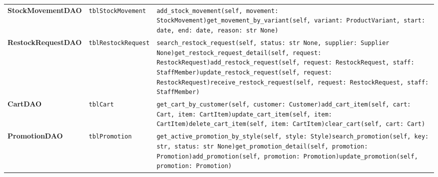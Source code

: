 {\begin{xltabular}{\textwidth}{@{}L{3.5cm} L{3.4cm} Y@{}}
\textbf{StockMovementDAO} & \texttt{tblStockMovement} & \texttt{add\_\allowbreak{}stock\_\allowbreak{}movement(self,\allowbreak{} movement: StockMovement)}\newline \texttt{get\_\allowbreak{}movement\_\allowbreak{}by\_\allowbreak{}variant(self,\allowbreak{} variant: ProductVariant,\allowbreak{} start: date,\allowbreak{} end: date,\allowbreak{} reason: str \textbar{} None)} \\
\textbf{RestockRequestDAO} & \texttt{tblRestockRequest} & \texttt{search\_\allowbreak{}restock\_\allowbreak{}request(self,\allowbreak{} status: str \textbar{} None,\allowbreak{} supplier: Supplier \textbar{} None)}\newline \texttt{get\_\allowbreak{}restock\_\allowbreak{}request\_\allowbreak{}detail(self,\allowbreak{} request: RestockRequest)}\newline \texttt{add\_\allowbreak{}restock\_\allowbreak{}request(self,\allowbreak{} request: RestockRequest,\allowbreak{} staff: StaffMember)}\newline \texttt{update\_\allowbreak{}restock\_\allowbreak{}request(self,\allowbreak{} request: RestockRequest)}\newline \texttt{receive\_\allowbreak{}restock\_\allowbreak{}request(self,\allowbreak{} request: RestockRequest,\allowbreak{} staff: StaffMember)} \\
\textbf{CartDAO} & \texttt{tblCart} & \texttt{get\_\allowbreak{}cart\_\allowbreak{}by\_\allowbreak{}customer(self,\allowbreak{} customer: Customer)}\newline \texttt{add\_\allowbreak{}cart\_\allowbreak{}item(self,\allowbreak{} cart: Cart,\allowbreak{} item: CartItem)}\newline \texttt{update\_\allowbreak{}cart\_\allowbreak{}item(self,\allowbreak{} item: CartItem)}\newline \texttt{delete\_\allowbreak{}cart\_\allowbreak{}item(self,\allowbreak{} item: CartItem)}\newline \texttt{clear\_\allowbreak{}cart(self,\allowbreak{} cart: Cart)} \\
\textbf{PromotionDAO} & \texttt{tblPromotion} & \texttt{get\_\allowbreak{}active\_\allowbreak{}promotion\_\allowbreak{}by\_\allowbreak{}style(self,\allowbreak{} style: Style)}\newline \texttt{search\_\allowbreak{}promotion(self,\allowbreak{} key: str,\allowbreak{} status: str \textbar{} None)}\newline \texttt{get\_\allowbreak{}promotion\_\allowbreak{}detail(self,\allowbreak{} promotion: Promotion)}\newline \texttt{add\_\allowbreak{}promotion(self,\allowbreak{} promotion: Promotion)}\newline \texttt{update\_\allowbreak{}promotion(self,\allowbreak{} promotion: Promotion)} \\

\end{xltabular}}
